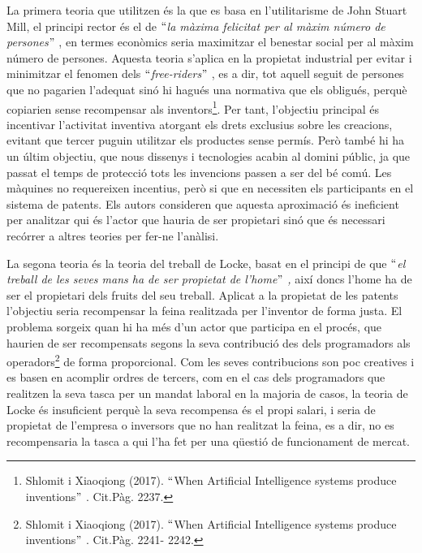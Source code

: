 \documentclass[12pt]{article}
\renewcommand{\_}{\kern-1.5pt\textunderscore\kern-1.5pt}
\begin{document}
\begin{itemize}
\vspace{\baselineskip}
\begin{justify}
La primera teoria que utilitzen és la que es basa en l’utilitarisme de John Stuart Mill, el principi rector és el de $``$\textit{la màxima felicitat per al màxim número de persones}$"$ , en termes econòmics seria maximitzar el benestar social per al màxim número de persones. Aquesta teoria s’aplica en la propietat industrial  per evitar i minimitzar el fenomen dels $``$\textit{free-riders$"$ }, es a dir, tot aquell seguit de persones que no pagarien l’adequat sinó hi hagués una normativa que els obligués, perquè copiarien sense recompensar als inventors\footnote{ Shlomit i Xiaoqiong (2017). $``$When Artificial Intelligence systems produce inventions$"$ . Cit.Pàg. 2237. }. Per tant, l’objectiu principal és incentivar l’activitat inventiva atorgant els drets exclusius sobre les creacions, evitant que tercer puguin utilitzar els productes sense permís. Però també hi ha un últim objectiu, que nous dissenys i tecnologies acabin al domini públic, ja que passat el temps de protecció tots les invencions passen a ser del bé comú. Les màquines no requereixen incentius, però si que en necessiten els participants en el sistema de patents. Els autors consideren que aquesta aproximació és ineficient per analitzar qui és l’actor que hauria de ser propietari sinó que és necessari recórrer a altres teories per fer-ne l’anàlisi.
\end{justify}\par


\vspace{\baselineskip}
\begin{justify}
La segona teoria és la teoria del treball de Locke, basat en el principi de que $``$\textit{el treball de les seves mans ha de ser propietat de l’home$"$ , }així doncs l’home ha de ser el propietari dels fruits del seu treball. Aplicat a la propietat de les patents l’objectiu seria recompensar la feina realitzada per l’inventor de forma justa. El problema sorgeix quan hi ha més d’un actor que participa en el procés,  que haurien de ser recompensats segons la seva contribució des dels programadors als operadors\footnote{ Shlomit i Xiaoqiong (2017). $``$When Artificial Intelligence systems produce inventions$"$ . Cit.Pàg. 2241- 2242. } de forma proporcional. Com les seves contribucions son poc creatives i es basen en acomplir ordres de tercers, com en el cas dels programadors que realitzen la seva tasca per un mandat laboral en la majoria de casos, la teoria de Locke és insuficient perquè la seva recompensa és el propi salari, i seria de propietat de l’empresa o inversors que no han realitzat la feina, es a dir, no es recompensaria la tasca a qui l’ha fet per una qüestió de funcionament de mercat. 
\end{justify}\par



\end{itemize}
\end{document}
